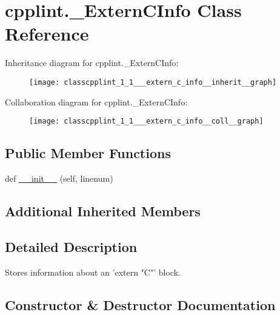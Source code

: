 \hypertarget{classcpplint_1_1___extern_c_info}{}\section{cpplint.\+\_\+\+Extern\+C\+Info Class Reference}
\label{classcpplint_1_1___extern_c_info}


Inheritance diagram for cpplint.\+\_\+\+Extern\+C\+Info\+:
\nopagebreak
\begin{figure}[H]
\begin{center}
\leavevmode
\texttt{[image: classcpplint\_1\_1\_\_\_extern\_c\_info\_\_inherit\_\_graph]}
\end{center}
\end{figure}


Collaboration diagram for cpplint.\+\_\+\+Extern\+C\+Info\+:
\nopagebreak
\begin{figure}[H]
\begin{center}
\leavevmode
\texttt{[image: classcpplint\_1\_1\_\_\_extern\_c\_info\_\_coll\_\_graph]}
\end{center}
\end{figure}
\subsection*{Public Member Functions}
\begin{DoxyCompactItemize}
\item 
def \hyperlink{classcpplint_1_1___extern_c_info_a903a8aefdb01fd5be044f920ea110d0a}{\+\_\+\+\_\+init\+\_\+\+\_\+} (self, linenum)
\end{DoxyCompactItemize}
\subsection*{Additional Inherited Members}


\subsection{Detailed Description}
\begin{DoxyVerb}Stores information about an 'extern "C"' block.\end{DoxyVerb}
 

\subsection{Constructor \& Destructor Documentation}
